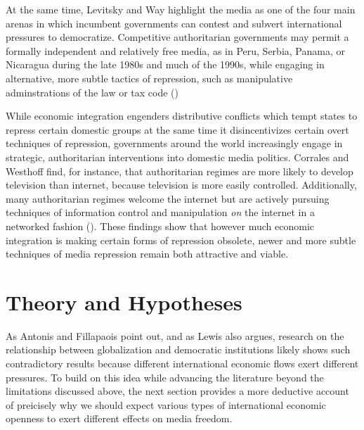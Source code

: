 \documentclass[12pt]{report}
\begin{document}
At the same time, Levitsky and Way highlight the media as one of the
four main arenas in which incumbent governments can contest and subvert
international pressures to democratize. Competitive authoritarian
governments may permit a formally independent and relatively free
media, as in Peru, Serbia, Panama, or Nicaragua during the late 1980s
and much of the 1990s, while engaging in alternative, more subtle
tactics of repression, such as manipulative adminstrations of the
law or tax code (\citealt[53,58]{Levitsky:2002gx})

While economic integration engenders distributive conflicts which
tempt states to repress certain domestic groups at the same time it
disincentivizes certain overt techniques of repression, governments
around the world increasingly engage in strategic, authoritarian interventions
into domestic media politics. Corrales and Westhoff \citeyearpar{Corrales:2006vz}
find, for instance, that authoritarian regimes are more likely to
develop television than internet, because television is more easily
controlled. Additionally, many authoritarian regimes welcome the internet
but are actively pursuing techniques of information control and manipulation
\emph{on} the internet in a networked fashion (\citealt{MacKinnon:2011id,Pearce:2012fm}). These findings show that however much economic integration is making certain forms of repression obsolete, newer and more subtle techniques
of media repression remain both attractive and viable.

\section{Theory and Hypotheses}

As Antonis and Fillapaois point out, and as Lewis also argues, research
on the relationship between globalization and democratic institutions
likely shows such contradictory results because different international
economic flows exert different pressures. To build on this idea while
advancing the literature beyond the limitations discussed above, the
next section provides a more deductive account of preicisely why we
should expect various types of international economic openness to
exert different effects on media freedom.
\end{document}
